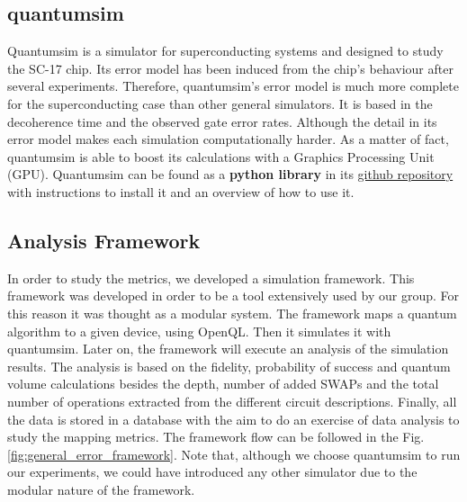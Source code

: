 \subsection{quantumsim}
\label{sec:org96b0d71}

Quantumsim \cite{O_Brien_2017} is a simulator for superconducting systems and designed to study the SC-17 chip.
Its error model has been induced from the chip's behaviour after several experiments.
Therefore, quantumsim's error model is much more complete for the superconducting case than other general simulators.
It is based in the decoherence time and the observed gate error rates.
Although the detail in its error model makes each simulation computationally harder.
As a matter of fact, quantumsim is able to boost its calculations with a Graphics Processing Unit (GPU).
Quantumsim can be found as a \textbf{python library} in its \href{https://github.com/quantumsim/quantumsim}{github repository} with instructions to install it and an overview of how to use it.

\subsection{Analysis Framework}
\label{sec:org60b7659}
In order to study the metrics, we developed a simulation framework.
This framework was developed in order to be a tool extensively used by our group.
For this reason it was thought as a modular system.
The framework maps a quantum algorithm to a given device, using OpenQL.
Then it simulates it with quantumsim.
Later on, the framework will execute an analysis of the simulation results.
The analysis is based on the fidelity, probability of success and quantum volume calculations besides the depth, number of added SWAPs and the total number of operations extracted from the different circuit descriptions.
Finally, all the data is stored in a database with the aim to do an exercise of data analysis to study the mapping metrics.
The framework flow can be followed in the Fig. \ref{fig:general_error_framework}.
Note that, although we choose quantumsim to run our experiments, we could have introduced any other simulator due to the modular nature of the framework.



